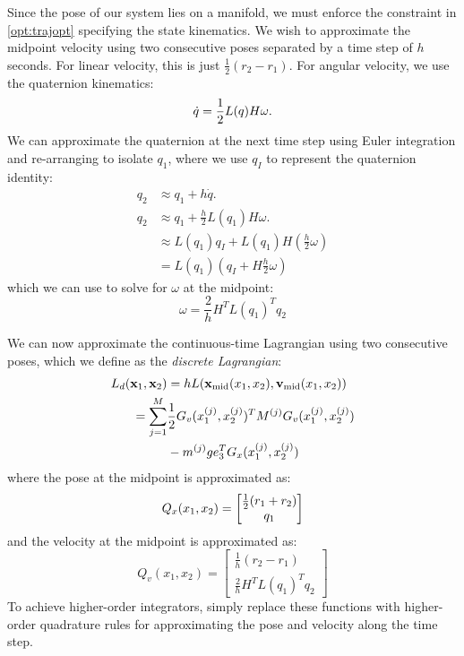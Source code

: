 \documentclass[conference]{IEEEtran}
\begin{document}
Since the pose of our system lies on a manifold, we must enforce the constraint in 
\eqref{opt:trajopt} specifying the state kinematics. We wish to approximate the midpoint 
velocity using two consecutive poses separated by a time step of $h$ seconds. For linear 
velocity, this is just $\frac{1}{2} (r_2 - r_1)$. For angular velocity, we use the quaternion
kinematics:
\begin{equation}
    \dot{q} = \frac{1}{2} L(q) H \omega.
\end{equation}
We can approximate the quaternion at the next time step using Euler integration and 
re-arranging to isolate $q_1$, where we use $q_I$ to represent the quaternion identity:
\begin{subequations}
    \begin{align}
        q_{2} &\approx q_1 + h \dot{q}. \\
        q_{2} &\approx q_1 + \frac{h}{2} L(q_1) H \omega. \\
        &\approx L(q_1) q_I + L(q_1) H \left(\frac{h}{2} \omega\right) \\
        &= L(q_1) \left(q_I + H \frac{h}{2} \omega\right)
    \end{align}
\end{subequations}
which we can use to solve for $\omega$ at the midpoint:
\begin{equation}
    \omega = \frac{2}{h} H^T L(q_1)^T q_2
\end{equation}

We can now approximate the continuous-time Lagrangian using two consecutive poses, which we
define as the \textit{discrete Lagrangian}:
\begin{subequations}
    \begin{align}
        L_d(\mathbf{x}_1, \mathbf{x}_2) 
            &= h L(\mathbf{x}_\text{mid}(x_1, x_2), \mathbf{v}_\text{mid}(x_1, x_2)) \\
        = \sum_{j=1}^M &\half G_v(x_1^{(j)}, x_2^{(j)})^T M^{(j)} G_v(x_1^{(j)}, x_2^{(j)}) \nonumber \\
        &- m^{(j)} g e_3^T G_x(x_1^{(j)}, x_2^{(j)}) \label{eq:discrete_lagrangian}
    \end{align}
\end{subequations}
where the pose at the midpoint is approximated as:
\begin{equation} \label{eq:quad_pose}
    Q_x(x_1, x_2) = \begin{bmatrix}
        \half (r_1 + r_2) \\ q_1
    \end{bmatrix}
\end{equation}
and the velocity at the midpoint is approximated as:
\begin{equation} \label{eq:quad_vel}
    Q_v(x_1, x_2) = \begin{bmatrix}
        \frac{1}{h}(r_2 - r_1) \\ 
        \frac{2}{h} H^T L(q_1)^T q_2
    \end{bmatrix}
\end{equation}
To achieve higher-order integrators, simply replace these functions with higher-order 
quadrature rules for approximating the pose and velocity along the time step.
\end{document}
